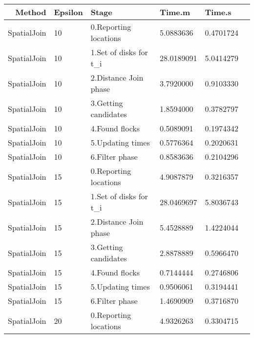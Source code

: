 \documentclass[11pt]{article}
\begin{document}
    \begin{tabular}{r|lllll}
 Method & Epsilon & Stage & Time.m & Time.s\\
\hline
	 SpatialJoin            & 10                     & 0.Reporting locations  &  5.0883636             & 0.4701724             \\
	 SpatialJoin              & 10                       & 1.Set of disks for t\_i & 28.0189091               & 5.0414279               \\
	 SpatialJoin            & 10                     & 2.Distance Join phase  &  3.7920000             & 0.9103330             \\
	 SpatialJoin            & 10                     & 3.Getting candidates   &  1.8594000             & 0.3782797             \\
	 SpatialJoin            & 10                     & 4.Found flocks         &  0.5089091             & 0.1974342             \\
	 SpatialJoin            & 10                     & 5.Updating times       &  0.5776364             & 0.2020631             \\
	 SpatialJoin            & 10                     & 6.Filter phase         &  0.8583636             & 0.2104296             \\
	 SpatialJoin            & 15                     & 0.Reporting locations  &  4.9087879             & 0.3216357             \\
	 SpatialJoin              & 15                       & 1.Set of disks for t\_i & 28.0469697               & 5.8036743               \\
	 SpatialJoin            & 15                     & 2.Distance Join phase  &  5.4528889             & 1.4224044             \\
	 SpatialJoin            & 15                     & 3.Getting candidates   &  2.8878889             & 0.5966470             \\
	 SpatialJoin            & 15                     & 4.Found flocks         &  0.7144444             & 0.2746806             \\
	 SpatialJoin            & 15                     & 5.Updating times       &  0.9506061             & 0.3194441             \\
	 SpatialJoin            & 15                     & 6.Filter phase         &  1.4690909             & 0.3716870             \\
	 SpatialJoin            & 20                     & 0.Reporting locations  &  4.9326263             & 0.3304715             \\
\end{tabular}
\end{document}
